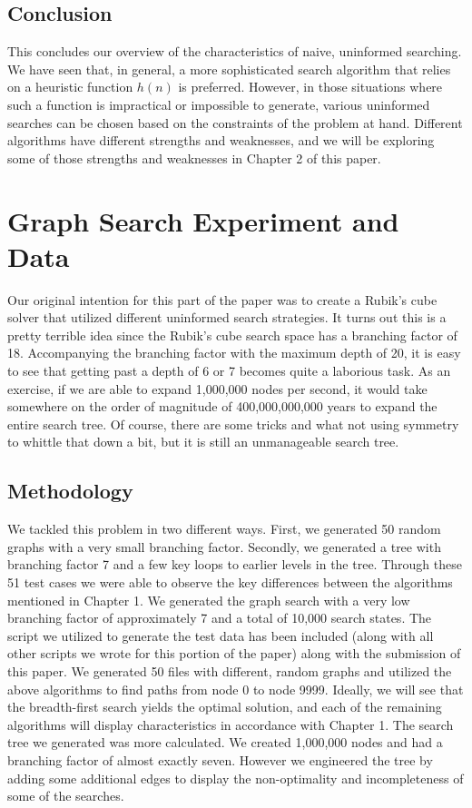 \documentclass[a4paper,11pt]{report}
\begin{document}
\section{Conclusion}
This concludes our overview of the characteristics of naive, uninformed
searching.  We have seen that, in general, a more sophisticated search
algorithm that relies on a heuristic function $h(n)$ is preferred.  However, in
those situations where such a function is impractical or impossible to
generate, various uninformed searches can be chosen based on the constraints of
the problem at hand.  Different algorithms have different strengths and
weaknesses, and we will be exploring some of those strengths and weaknesses in
Chapter 2 of this paper.

\chapter{Graph Search Experiment and Data}
Our original intention for this part of the paper was to create a Rubik's cube
solver that utilized different uninformed search strategies.  It turns out this
is a pretty terrible idea since the Rubik's cube search space has a branching
factor of 18. Accompanying the branching factor with the maximum depth of 20,
it is easy to see that getting past a depth of 6 or 7 becomes quite a laborious
task. As an exercise, if we are able to expand 1,000,000 nodes per second, it
would take somewhere on the order of magnitude of 400,000,000,000 years to
expand the entire search tree.  Of course, there are some tricks and what not
using symmetry to whittle that down a bit, but it is still an unmanageable
search tree.\newline

\section{Methodology}
We tackled this problem in two different ways.  First, we generated 50 random
graphs with a very small branching factor.  Secondly, we generated a tree with
branching factor 7 and a few key loops to earlier levels in the tree.  Through
these 51 test cases we were able to observe the key differences between the
algorithms mentioned in Chapter 1.  We generated the graph search with a very
low branching factor of approximately 7 and a total of 10,000 search states.
The script we utilized to generate the test data has been included (along with
all other scripts we wrote for this portion of the paper)
along with the submission of this paper.  We generated 50 files with different,
random graphs and utilized the above algorithms to find paths from node 0 to
node 9999.  Ideally, we will see that the breadth-first search yields the
optimal solution, and each of the remaining algorithms will display
characteristics in accordance with Chapter 1. The search tree we generated was
more calculated. We created 1,000,000 nodes and had a branching factor of
almost exactly seven.  However we engineered the tree by adding some additional
edges to display the non-optimality and incompleteness of some of the searches.
\end{document}
